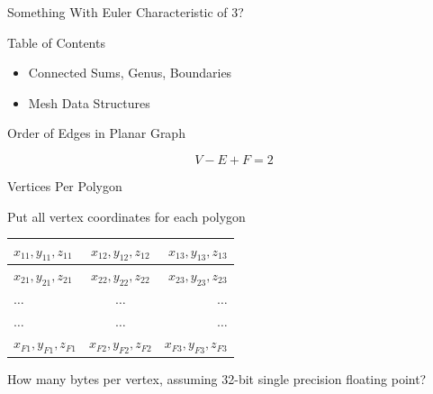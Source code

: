 \documentclass{beamer}
\begin{document}
\begin{frame}{Something With Euler Characteristic of 3?}


\end{frame}


\begin{frame}{Table of Contents}
\begin{itemize}[label=$\vartriangleright$]
	\item Connected Sums, Genus, Boundaries
\end{itemize}

\begin{itemize}[label=$\blacktriangleright$]
	\item Mesh Data Structures
\end{itemize}
\end{frame}

\begin{frame}{Order of Edges in Planar Graph}

\[ V - E + F = 2 \]





\end{frame}

\begin{frame}{Vertices Per Polygon}

Put all vertex coordinates for each polygon

\begin{center}
  \begin{tabular}{ | l | c | r |}
    \hline
    $x_{11}, y_{11}, z_{11}$ & $x_{12}, y_{12}, z_{12}$ & $x_{13}, y_{13}, z_{13}$ \\ \hline
    $x_{21}, y_{21}, z_{21}$ & $x_{22}, y_{22}, z_{22}$ & $x_{23}, y_{23}, z_{23}$ \\ \hline
    $\hdots$ & $\hdots$ & $\hdots$ \\ \hline
    $\hdots$ & $\hdots$ & $\hdots$ \\ \hline
    $x_{F1}, y_{F1}, z_{F1}$ & $x_{F2}, y_{F2}, z_{F2}$ & $x_{F3}, y_{F3}, z_{F3}$ \\ \hline
  \end{tabular}
\end{center}

How many bytes per vertex, assuming 32-bit single precision floating point?

\end{frame}
\end{document}
